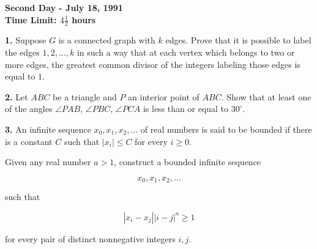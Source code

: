 \documentclass[12pt]{article}
\begin{document}
\begin{center}
\textbf{\large Second Day - July 18, 1991}\\
\textbf{Time Limit: $4\frac{1}{2}$ hours}
\end{center}

\vspace{0.4cm}

\noindent
\textbf{1.} Suppose $G$ is a connected graph with $k$ edges. Prove that it is possible to label the edges $1, 2, \ldots , k$ in such a way that at each vertex
which belongs to two or more edges, the greatest common divisor of
the integers labeling those edges is equal to $1$.

\vspace{0.2cm}


\vspace{0.3cm}

\noindent
\textbf{2.} Let $ABC$ be a triangle and $P$ an interior point of $ABC$. Show that
at least one of the angles $\angle PAB$, $\angle PBC$, $\angle PCA$ is less than or equal
to $30^\circ$.

\vspace{0.3cm}

\noindent
\textbf{3.} An infinite sequence $x_0, x_1, x_2, \ldots$ of real numbers is said to be bounded
if there is a constant $C$ such that $|x_i| \leq C$ for every $i \geq 0$.

\vspace{0.2cm}

Given any real number $a > 1$, construct a bounded infinite sequence

\[
x_0, x_1, x_2, \ldots
\]

such that

\[
|x_i - x_j||i - j|^a \geq 1
\]

for every pair of distinct nonnegative integers $i, j$.
\end{document}
